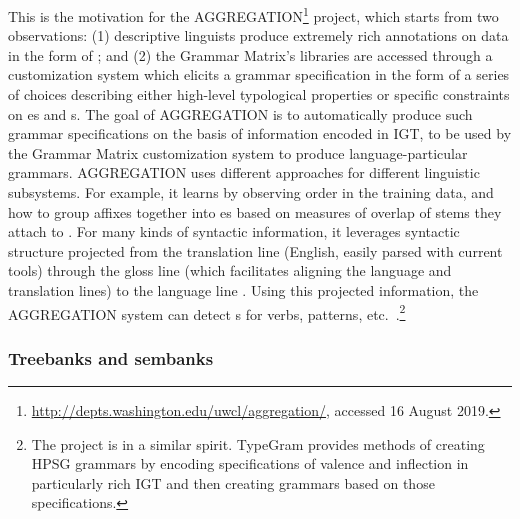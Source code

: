 \documentclass[output=paper
                ,modfonts
                ,nonflat
	        ,collection
	        ,collectionchapter
	        ,collectiontoclongg
 	        ,biblatex
                ,babelshorthands
                ,newtxmath
                ,draftmode
                ,colorlinks, citecolor=brown
]{./langsci/langscibook}
\begin{document}
This is the motivation for the AGGREGATION\footnote{\url{http://depts.washington.edu/uwcl/aggregation/}, accessed 16 August 2019.}
project, which starts from two observations: (1) descriptive linguists
produce extremely rich annotations on data in the form of ; and (2) the Grammar Matrix's libraries are
accessed through a customization system which elicits a grammar
specification in the form of a series of choices describing either
high-level typological properties or specific constraints on es and s.  The goal of AGGREGATION is to
automatically produce such grammar specifications on the basis of
information encoded in IGT, to be used by the Grammar Matrix
customization system to produce language-particular
grammars. AGGREGATION uses different approaches for different
linguistic subsystems. For example, it learns  by
observing  order in the training data, and how to group
affixes together into es based on measures of overlap of
stems they attach to \citep{Wax:14,Zamaraeva:17}. For many kinds of
syntactic information, it leverages syntactic structure projected from
the translation line (English, easily parsed with current tools)
through the gloss line (which facilitates aligning the language and
translation lines) to the language line
\citep{Xia:Lew:07,Georgi:16}. Using this projected information, the
AGGREGATION system can detect s for verbs, 
patterns, etc.\ \citep{Ben:Goo:Cro:Xia:13,Zam:How:Ben:19}.\footnote{The  project \citep{Hel:Bee:14} is in a similar spirit. TypeGram provides methods of creating HPSG grammars by encoding specifications of valence and inflection in particularly rich IGT and then creating grammars based on those specifications.}


\subsubsection{Treebanks and sembanks}
\label{cl:lang-doc:treebanks}

\end{document}
